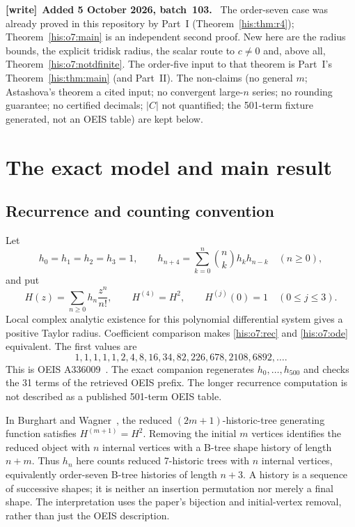 \documentclass[11pt]{article}
\theoremstyle{remark}\newtheorem{remark}[theorem]{Remark}
\numberwithin{equation}{section}
\newenvironment{writenote}[1][]{\par\smallskip\begingroup\small
 \noindent\textbf{[write]}\if\relax\detokenize{#1}\relax\else~\textbf{#1.}\fi\ }%
 {\par\endgroup\smallskip}
\begin{document}
\begin{writenote}[Added 5 October 2026, batch~103]
The order-seven case was already proved in this repository by Part~I (Theorem~\ref{his:thm:r4}); Theorem~\ref{his:o7:main} is an independent second proof. New here are the radius bounds, the explicit tridisk radius, the scalar route to $c\ne0$ and, above all, Theorem~\ref{his:o7:notdfinite}. The order-five input to that theorem is Part~I's Theorem~\ref{his:thm:main} (and Part~II). The non-claims (no general $m$; Astashova's theorem a cited input; no convergent large-$n$ series; no rounding guarantee; no certified decimals; $|C|$ not quantified; the 501-term fixture generated, not an OEIS table) are kept below.
\end{writenote}


\section{The exact model and main result}\label{his:o7:sec:model}
\subsection{Recurrence and counting convention}
Let
\begin{equation}\label{his:o7:rec}
h_0=h_1=h_2=h_3=1,\qquad
h_{n+4}=\sum_{k=0}^n\binom nk h_kh_{n-k}\quad(n\ge0),
\end{equation}
and put
\begin{equation}\label{his:o7:ode}
H(z)=\sum_{n\ge0}h_n\frac{z^n}{n!},\qquad
H^{(4)}=H^2,\qquad H^{(j)}(0)=1\quad(0\le j\le3).
\end{equation}
Local complex analytic existence for this polynomial differential
system gives a positive Taylor radius. Coefficient comparison makes
\eqref{his:o7:rec} and \eqref{his:o7:ode} equivalent. The first values are
\[
1,1,1,1,1,2,4,8,16,34,82,226,678,2108,6892,\ldots.
\]
This is OEIS A336009~\cite{oeisr4}. The exact companion regenerates
$h_0,\ldots,h_{500}$ and checks the 31 terms of the retrieved OEIS
prefix. The longer recurrence computation is not described as a
published 501-term OEIS table.

In Burghart and Wagner~\cite[Section 4, equation (4)]{bw2026}, the
reduced $(2m+1)$-historic-tree generating function satisfies
$H^{(m+1)}=H^2$. Removing the initial $m$ vertices identifies the
reduced object with $n$ internal vertices with a B-tree shape history
of length $n+m$. Thus $h_n$ here counts reduced 7-historic trees with
$n$ internal vertices, equivalently order-seven B-tree histories of
length $n+3$. A history is a sequence of successive shapes; it is
neither an insertion permutation nor merely a final shape.
The interpretation uses the paper's bijection and initial-vertex removal,
rather than just the OEIS description.
\end{document}
